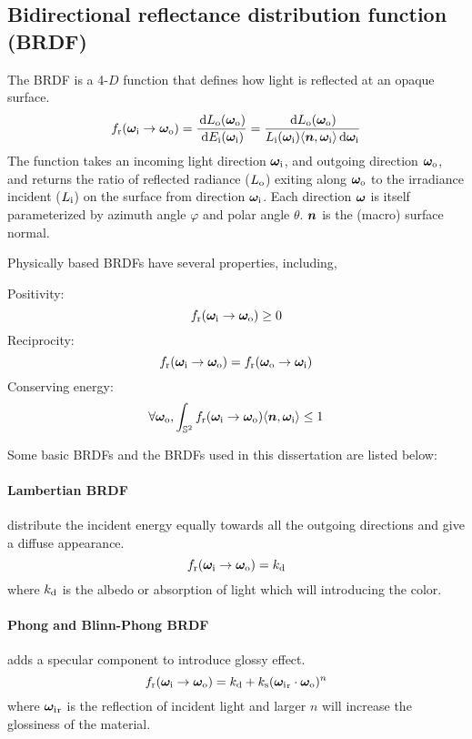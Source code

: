 \subsection{Bidirectional reflectance distribution function (BRDF)}
The BRDF is a 4-$D$ function that defines how light is reflected at an opaque surface. 
\begin{equation}
	f_\mathrm{r}(\bm\omega_\mathrm{i}\rightarrow\bm\omega_\mathrm{o}) = \frac{\,\mathrm{d} L_\mathrm{o}(\bm\omega_\mathrm{o})}{\,\mathrm{d} E_\mathrm{i}(\bm\omega_\mathrm{i})}
	= \frac{\,\mathrm{d}L_\mathrm{o}(\bm\omega_\mathrm{o})}{L_\mathrm{i}(\bm\omega_\mathrm{i}){\langle \bm{n},\bm\omega_\mathrm{i} \rangle}\,\mathrm{d}\bm\omega_\mathrm{i}}
\end{equation}
The function takes an incoming light direction $\bm\omega_\mathrm{i}$, and outgoing direction $\bm\omega_\mathrm{o}$, and returns the ratio of reflected radiance ($L_\mathrm{o}$) exiting along $\bm\omega_\mathrm{o}$ to the irradiance incident ($L_\mathrm{i}$) on the surface from direction $\bm\omega_\mathrm{i}$. Each direction $\bm\omega$ is itself parameterized by azimuth angle $\varphi$ and polar angle $\theta$. $\bm{n}$ is the (macro) surface normal.

Physically based BRDFs have several properties, including,

Positivity: 
\begin{equation}
	f_\mathrm{r}(\bm\omega_\mathrm{i}\rightarrow\bm\omega_\mathrm{o}) \geq 0
\end{equation}
Reciprocity:
\begin{equation}
	f_\mathrm{r}(\bm\omega_\mathrm{i}\rightarrow\bm\omega_\mathrm{o}) = f_\mathrm{r}(\bm\omega_\mathrm{o}\rightarrow\bm\omega_\mathrm{i})
\end{equation}
Conserving energy:
\begin{equation}
	\forall\bm\omega_\mathrm{o}, \int_{\mathbb{S}^2} f_\mathrm{r}(\bm\omega_\mathrm{i}\rightarrow\bm\omega_\mathrm{o}) {\langle \bm{n},\bm\omega_\mathrm{i} \rangle} \leq 1
\end{equation}

Some basic BRDFs and the BRDFs used in this dissertation are listed below:

\paragraph{Lambertian BRDF} distribute the incident energy equally towards all the outgoing directions and give a diffuse appearance.
\begin{equation}
	f_\mathrm{r}(\bm\omega_\mathrm{i}\rightarrow\bm\omega_\mathrm{o}) = k_\mathrm{d}
\end{equation}
where $k_\mathrm{d}$ is the albedo or absorption of light which will introducing the color.

\paragraph{Phong and Blinn-Phong BRDF} adds a specular component to introduce glossy effect.
\begin{equation}
	f_\mathrm{r}(\bm\omega_\mathrm{i}\rightarrow\bm\omega_\mathrm{o}) = k_\mathrm{d} + k_\mathrm{s}({\bm\omega_\mathrm{i}}_\mathrm{r} \cdot \bm\omega_\mathrm{o})^n
\end{equation}
where ${\bm\omega_\mathrm{i}}_\mathrm{r}$ is the reflection of incident light and larger $n$ will increase the glossiness of the material. 

